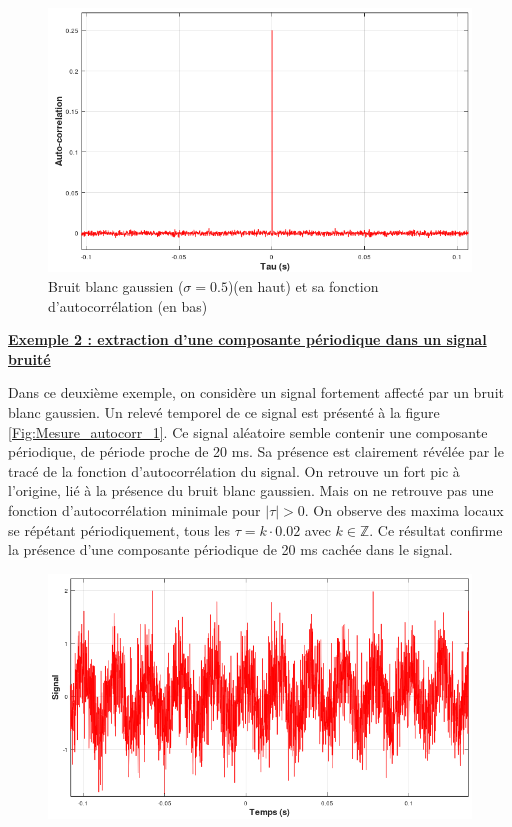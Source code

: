 	\begin{figure}[h!]
		\centering
		\includegraphics[scale=0.6]{images/Mesure_autocorr_bruit_2.png}
		\caption{Bruit blanc gaussien ($\sigma = 0.5$)(en haut) et sa fonction d'autocorrélation (en bas)}	
		\label{Fig:Mesure_autocorr_bruit} 
	\end{figure}
	
	
	

	
	
	
	
	\textbf{\underline{Exemple 2 : extraction d'une composante périodique dans un signal bruité}}
	
	 Dans ce deuxième exemple, on considère un signal fortement affecté par un bruit blanc gaussien. Un relevé temporel de ce signal est présenté à la figure \ref{Fig:Mesure_autocorr_1}. Ce signal aléatoire semble contenir une composante périodique, de période proche de 20 ms. Sa présence est clairement révélée par le tracé de la fonction d'autocorrélation du signal. On retrouve un fort pic à l'origine, lié à la présence du bruit blanc gaussien. Mais on ne retrouve pas une fonction d'autocorrélation minimale pour $|\tau| > 0$. On observe des maxima locaux se répétant périodiquement, tous les $\tau=k \cdot 0.02$ avec $k \in \mathbb{Z}$. Ce résultat confirme la présence d'une composante périodique de 20 ms cachée dans le signal.
	
	\begin{figure}[h!]
		\centering
		\includegraphics[scale=0.6]{images/Mesure_autocorr_1.png}
	\end{figure}

